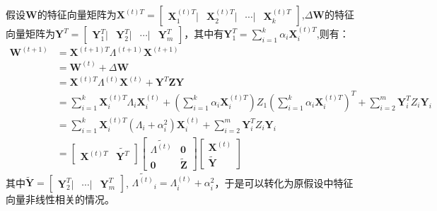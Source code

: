 假设$\textbf{W}$的特征向量矩阵为$\textbf{X}^{(t)T}=\begin{bmatrix} \textbf{X}^{(t)T}_1 | & \textbf{X}^{(t)T}_2 | & \cdots | & \textbf{X}^{(t)T}_k \end{bmatrix}$,$\Delta\textbf{W}$的特征向量矩阵为$\textbf{Y}^{T}=\begin{bmatrix} \textbf{Y}^T_1 | & \textbf{Y}^T_2 | & \cdots | & \textbf{Y}^T_m \end{bmatrix}$，其中有$\textbf{Y}^T_1 = \sum_{i=1}^{k} \alpha_i \textbf{X}^{(t)T}_i $,则有：
\begin{equation}\label{time_t1}
\begin{aligned}
\textbf{W}^{(t+1)} &= \textbf{X}^{(t+1)T} \Lambda^{(t+1)} \textbf{X} ^{(t+1)} \\
&= \textbf{W}^{(t)} + \Delta \textbf{W} \\
&= \textbf{X}^{(t)T} \Lambda^{(t)} \textbf{X} ^{(t)} +  \textbf{Y}^{T} \textbf{Z}  \textbf{Y} \\
&= \sum_{i=1}^{k}\textbf{X}^{(t)T}_i \Lambda_i  \textbf{X}^{(t)}_i + (\sum_{i=1}^{k} \alpha_i \textbf{X}^{(t)T}_i) Z_1 (\sum_{i=1}^{k} \alpha_i \textbf{X}^{(t)T}_i)^T +\sum_{i=2}^{m}\textbf{Y}^{T}_i Z_i  \textbf{Y}_i \\
&= \sum_{i=1}^{k}\textbf{X}^{(t)T}_i (\Lambda_i+\alpha_i^2)  \textbf{X}^{(t)}_i +
\sum_{i=2}^{m}\textbf{Y}^{T}_i Z_i  \textbf{Y}_i \\
&= \begin{bmatrix} \textbf{X}^{(t)T} & \tilde{\textbf{Y}^{T}}\end{bmatrix}
\begin{bmatrix}  \tilde{\Lambda^{(t)}} & \textbf{0}\\
\textbf{0} & \tilde{\textbf{Z}}
\end{bmatrix}
\begin{bmatrix} \textbf{X}^{(t)} \\ \tilde{\textbf{Y}}\end{bmatrix}
\end{aligned}
\end{equation}
其中$\tilde{\textbf{Y}} =\begin{bmatrix}  \textbf{Y}^T_2 | & \cdots | & \textbf{Y}^T_m \end{bmatrix}$, $\tilde{\Lambda^{(t)}}_i = \Lambda^{(t)}_i+\alpha_i^2$，于是可以转化为原假设中特征向量非线性相关的情况。

